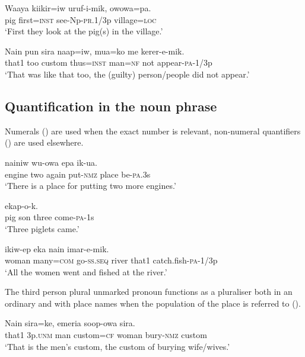 \ea%
\label{ex:x1284}
\gll Waaya  kiikir=iw  uruf-i-mik,  owowa=pa. \\
pig  first=\textsc{inst}  see-Np-\textsc{pr}.1/3p  village=\textsc{loc} \\
\glt `First they look at the pig(s) in the village.'
\z

\ea%
\label{ex:x1285}
\gll Nain  pun  sira  naap=iw,  mua=ko  me  kerer-e-mik. \\
that1  too  custom  thus=\textsc{inst}  man=\textsc{nf}  not  appear-\textsc{pa}-1/3p\\
\glt `That was like that too, the (guilty) person/people did not appear.'
\z

\subsection{Quantification in the noun phrase}
{}
Numerals () are used when the exact number is relevant, non-numeral quantifiers () are used elsewhere.  

\ea%
\label{ex:x1286}
\gll {}   nainiw  wu-owa  epa  ik-ua. \\
engine  two  again  put-\textsc{nmz}  place  be-\textsc{pa}.3s\\
\glt `There is a place for putting two more engines.'
\z

\ea%
\label{ex:x1308}
\gll {}     ekap-o-k. \\
pig  son  three  come-\textsc{pa}-1s\\
\glt `Three piglets came.'
\z

\ea%
\label{ex:x1287}
\gll {}    ikiw-ep  eka  nain  imar-e-mik. \\
woman  many=\textsc{com}  go-\textsc{ss}.\textsc{seq}  river  that1  catch.fish-\textsc{pa}-1/3p\\
\glt `All the women went and fished at the river.'
\z

The third person plural unmarked pronoun functions as a pluraliser both in an ordinary  and with place names when the population of the place is referred to (). 

\ea%
\label{ex:x1288}
\gll Nain     sira=ke,  emeria  soop-owa  sira. \\
that1  3p.\textsc{unm}  man  custom=\textsc{cf}  woman  bury-\textsc{nmz}  custom\\
\glt `That is the men's custom, the custom of burying wife/wives.'
\z

